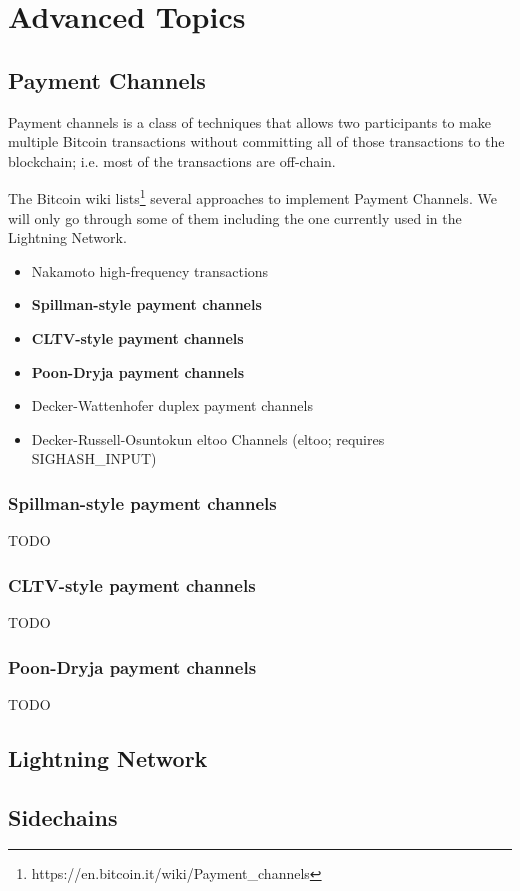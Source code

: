\chapter{Advanced Topics} 


\section{Payment Channels}
\label{sec:payment-channels}
Payment channels is a class of techniques that allows two participants to make multiple Bitcoin transactions without committing all of those transactions to the blockchain; i.e. most of the transactions are off-chain.

The Bitcoin wiki lists\footnote{https://en.bitcoin.it/wiki/Payment\_channels} several approaches to implement Payment Channels. We will only go through some of them including the one currently used in the Lightning Network.

\begin{itemize}
\item Nakamoto high-frequency transactions
\item \textbf{Spillman-style payment channels}
\item \textbf{CLTV-style payment channels}
\item \textbf{Poon-Dryja payment channels}
\item Decker-Wattenhofer duplex payment channels
\item Decker-Russell-Osuntokun eltoo Channels (eltoo; requires SIGHASH\_INPUT)
\end{itemize}


\subsection*{Spillman-style payment channels}
TODO


\subsection*{CLTV-style payment channels}
TODO


\subsection*{Poon-Dryja payment channels}
TODO



\section{Lightning Network}



\section{Sidechains}

